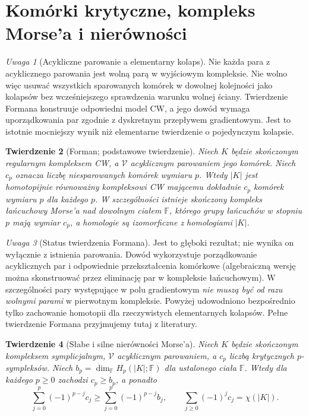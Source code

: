 \documentclass[11pt,a4paper]{report}
\numberwithin{equation}{section}
\theoremstyle{plain}
\newtheorem{twierdzenie}{Twierdzenie}[section]
\theoremstyle{definition}
\theoremstyle{remark}
\newtheorem{uwaga}[twierdzenie]{Uwaga}
\begin{document}
\section{Komórki krytyczne, kompleks Morse'a i nierówności}
\label{sec:tg-forman-inequalities}

\begin{uwaga}[Acykliczne parowanie a elementarny kolaps]
Nie każda para z acyklicznego parowania jest wolną parą
w wyjściowym kompleksie. Nie wolno więc usuwać wszystkich
sparowanych komórek w dowolnej kolejności jako kolapsów
bez wcześniejszego sprawdzenia warunku wolnej ściany.
Twierdzenie Formana konstruuje odpowiedni model CW,
a jego dowód wymaga uporządkowania par zgodnie z dyskretnym
przepływem gradientowym. Jest to istotnie mocniejszy wynik
niż elementarne twierdzenie o pojedynczym kolapsie.
\end{uwaga}

\begin{twierdzenie}[Forman; podstawowe twierdzenie]
\label{thm:tg-forman-main}
Niech $K$ będzie skończonym regularnym kompleksem CW,
a $\mathcal V$ acyklicznym parowaniem jego komórek.
Niech $c_p$ oznacza liczbę niesparowanych komórek
wymiaru $p$. Wtedy $|K|$ jest homotopijnie równoważny
kompleksowi CW mającemu dokładnie $c_p$ komórek
wymiaru $p$ dla każdego $p$.
W szczególności istnieje skończony kompleks łańcuchowy
Morse'a nad dowolnym ciałem $\mathbb F$, którego grupy łańcuchów
w stopniu $p$ mają wymiar $c_p$, a homologie są
izomorficzne z homologiami $|K|$.
\end{twierdzenie}

\begin{uwaga}[Status twierdzenia Formana]
Jest to głęboki rezultat; nie wynika on wyłącznie z
istnienia parowania. Dowód wykorzystuje porządkowanie
acyklicznych par i odpowiednie przekształcenia komórkowe
(algebraiczną wersję można skonstruować przez eliminację
par w kompleksie łańcuchowym). W szczególności pary
występujące w polu gradientowym \emph{nie muszą być
od razu wolnymi parami} w pierwotnym kompleksie.
Powyżej udowodniono bezpośrednio tylko zachowanie
homotopii dla rzeczywistych elementarnych kolapsów.
Pełne twierdzenie Formana przyjmujemy tutaj z literatury.
\end{uwaga}

\begin{twierdzenie}[Słabe i silne nierówności Morse'a]
\label{thm:tg-forman-ineq}
Niech $K$ będzie skończonym kompleksem symplicjalnym,
$\mathcal V$ acyklicznym parowaniem, a $c_p$ liczbą
krytycznych $p$-sympleksów. Niech
$b_p=\dim_{\mathbb F}H_p(|K|;\mathbb F)$
dla ustalonego ciała $\mathbb F$. Wtedy dla każdego
$p\ge0$ zachodzi $c_p\ge b_p$, a ponadto
\[
 \sum_{j=0}^p(-1)^{p-j}c_j
 \ge \sum_{j=0}^p(-1)^{p-j}b_j,
 \qquad
 \sum_{j\ge0}(-1)^jc_j=\chi(|K|).
\]
\end{twierdzenie}
\end{document}
